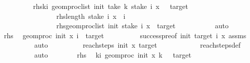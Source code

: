 \begin{isabellebody}
\ \ \ \ \ \ \isamarkupfalse%
\ \isamarkupfalse%
\ rhs{}{\isacharcolon}{\kern0pt}{\isachardoublequoteopen}{\isasymforall}k{\isacharless}{\kern0pt}i{\isachardot}{\kern0pt}\ geom{\isacharunderscore}{\kern0pt}proc{\isacharunderscore}{\kern0pt}list\ {\isacharparenleft}{\kern0pt}init{\isacharparenright}{\kern0pt}\ {\isacharparenleft}{\kern0pt}take\ k\ {\isacharparenleft}{\kern0pt}stake\ i\ x{\isacharparenright}{\kern0pt}{\isacharparenright}{\kern0pt}\ {\isasymnotin}\ {\isacharbraceleft}{\kern0pt}{}{\isacharcomma}{\kern0pt}\ target{\isacharbraceright}{\kern0pt}{\isachardoublequoteclose}\ \isanewline
\ \ \ \ \ \ \ \ \ \ \ \ \ \ \ \ rhs{}{\isacharcolon}{\kern0pt}{\isachardoublequoteopen}length\ {\isacharparenleft}{\kern0pt}stake\ i\ x{\isacharparenright}{\kern0pt}\ {\isacharequal}{\kern0pt}\ i{\isachardoublequoteclose}\ \ \isanewline
\ \ \ \ \ \ \ \ \ \ \ \ \ \ \ \ rhs{}{\isacharcolon}{\kern0pt}{\isachardoublequoteopen}geom{\isacharunderscore}{\kern0pt}proc{\isacharunderscore}{\kern0pt}list\ {\isacharparenleft}{\kern0pt}init{\isacharparenright}{\kern0pt}\ {\isacharparenleft}{\kern0pt}stake\ i\ x{\isacharparenright}{\kern0pt}\ {\isacharequal}{\kern0pt}\ target{\isachardoublequoteclose}\ \isanewline
\ \ \ \ \ \ \ \ \isamarkupfalse%
\ auto\isanewline
\ \ \ \ \ \ \isamarkupfalse%
\ rhs{}\ \isamarkupfalse%
\ {\isachardoublequoteopen}geom{\isacharunderscore}{\kern0pt}proc\ init\ x\ i\ {\isacharequal}{\kern0pt}\ target{\isachardoublequoteclose}\isanewline
\ \ \ \ \ \ \ \ \isamarkupfalse%
\ success{\isacharunderscore}{\kern0pt}pre{\isacharbrackleft}{\kern0pt}of\ init\ target\ i\ x{\isacharbrackright}{\kern0pt}\ assms\isanewline
\ \ \ \ \ \ \ \ \isamarkupfalse%
\ auto\isanewline
\ \ \ \ \ \ \isamarkupfalse%
\ \isamarkupfalse%
\ {\isachardoublequoteopen}reach{\isacharunderscore}{\kern0pt}steps\ init\ x\ target\ {\isasymnoteq}\ {\isacharbraceleft}{\kern0pt}{\isacharbraceright}{\kern0pt}{\isachardoublequoteclose}\isanewline
\ \ \ \ \ \ \ \ \isamarkupfalse%
\ reach{\isacharunderscore}{\kern0pt}steps{\isacharunderscore}{\kern0pt}def\isanewline
\ \ \ \ \ \ \ \ \isamarkupfalse%
\ auto\isanewline
\ \ \ \ \ \ \isamarkupfalse%
\ rhs{}\ \isamarkupfalse%
\ {\isachardoublequoteopen}{\isasymforall}k{\isacharless}{\kern0pt}i{\isachardot}{\kern0pt}\ geom{\isacharunderscore}{\kern0pt}proc\ init\ x\ k\ {\isasymnotin}\ {\isacharbraceleft}{\kern0pt}{}{\isacharcomma}{\kern0pt}\ target{\isacharbraceright}{\kern0pt}{\isachardoublequoteclose}\isanewline

\end{isabellebody}

